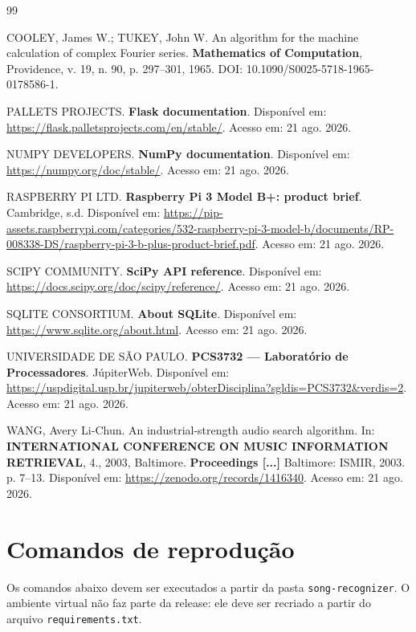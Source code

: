 \documentclass[12pt,a4paper]{article}
\newcommand{\codigo}[1]{\texttt{#1}}
\begin{document}
\clearpage
\begin{thebibliography}{99}

COOLEY, James W.; TUKEY, John W. An algorithm for the machine calculation of
complex Fourier series. \textbf{Mathematics of Computation}, Providence, v. 19,
n. 90, p. 297--301, 1965. DOI: 10.1090/S0025-5718-1965-0178586-1.

PALLETS PROJECTS. \textbf{Flask documentation}. Disponível em:
\url{https://flask.palletsprojects.com/en/stable/}. Acesso em: 21 ago. 2026.

NUMPY DEVELOPERS. \textbf{NumPy documentation}. Disponível em:
\url{https://numpy.org/doc/stable/}. Acesso em: 21 ago. 2026.

RASPBERRY PI LTD. \textbf{Raspberry Pi 3 Model B+: product brief}. Cambridge,
s.d. Disponível em:
\url{https://pip-assets.raspberrypi.com/categories/532-raspberry-pi-3-model-b/documents/RP-008338-DS/raspberry-pi-3-b-plus-product-brief.pdf}.
Acesso em: 21 ago. 2026.

SCIPY COMMUNITY. \textbf{SciPy API reference}. Disponível em:
\url{https://docs.scipy.org/doc/scipy/reference/}. Acesso em: 21 ago. 2026.

SQLITE CONSORTIUM. \textbf{About SQLite}. Disponível em:
\url{https://www.sqlite.org/about.html}. Acesso em: 21 ago. 2026.

UNIVERSIDADE DE SÃO PAULO. \textbf{PCS3732 --- Laboratório de Processadores}.
JúpiterWeb. Disponível em:
\url{https://uspdigital.usp.br/jupiterweb/obterDisciplina?sgldis=PCS3732&verdis=2}.
Acesso em: 21 ago. 2026.

WANG, Avery Li-Chun. An industrial-strength audio search algorithm. In:
\textbf{INTERNATIONAL CONFERENCE ON MUSIC INFORMATION RETRIEVAL}, 4., 2003,
Baltimore. \textbf{Proceedings [...]} Baltimore: ISMIR, 2003. p. 7--13.
Disponível em: \url{https://zenodo.org/records/1416340}. Acesso em: 21 ago. 2026.

\end{thebibliography}

\appendix
\clearpage
\section{Comandos de reprodução}

Os comandos abaixo devem ser executados a partir da pasta
\codigo{song-recognizer}. O ambiente virtual não faz parte da release: ele deve
ser recriado a partir do arquivo \codigo{requirements.txt}.
\end{document}
